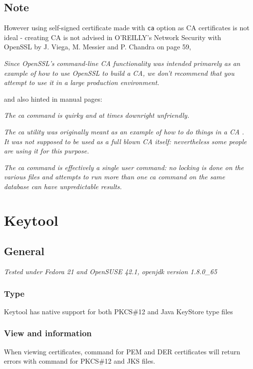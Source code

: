 \documentclass[10pt, a4paper]{report}
\begin{document}
\section{Note}
However using self-signed certificate made with \verb+ca+ option as CA certificates is not ideal -  creating CA is not advised in O'REILLY's Network Security with OpenSSL by J. Viega, M. Messier and P. Chandra on page 59,
\begin{displayquote}
\textit{Since OpenSSL's command-line CA functionality was intended primarely as an example of how to use OpenSSL to build a CA, we don't recommend that you attempt to use it in a large production environment.}
\end{displayquote}
and also hinted in manual pages:
\begin{displayquote}
\textit{The ca command is quirky and at times downright unfriendly.}

\textit{The ca utility was originally meant as an example of how to do things in a CA . It was not supposed to be used as a full blown CA itself: nevertheless some people are using it for this purpose.}

\textit{The ca command is effectively a single user command: no locking is done on the various files and attempts to run more than one ca command on the same database can have unpredictable results.}

\end{displayquote}




\chapter{Keytool}

\section{General}

\textit{Tested under Fedora 21 and OpenSUSE 42.1, openjdk version 1.8.0\_65}

  \subsection{Type}
Keytool has native support for both PKCS\#12 and Java KeyStore type files 
  \subsection{View and information}
When viewing certificates, command for PEM and DER certificates will return errors with command for PKCS\#12 and JKS files.
\end{document}
